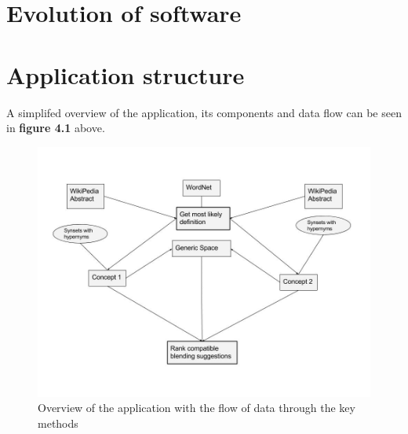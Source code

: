 
\section{Evolution of software}


\section{Application structure}
A simplifed overview of the application, its components and data flow can be seen in \textbf{figure 4.1} above.

\begin{figure}
\centering
\includegraphics[width=1\linewidth]{"Figures/Application structure"}
\caption{Overview of the application with the flow of data through the key methods}
\label{fig:application-structure}
\end{figure}


